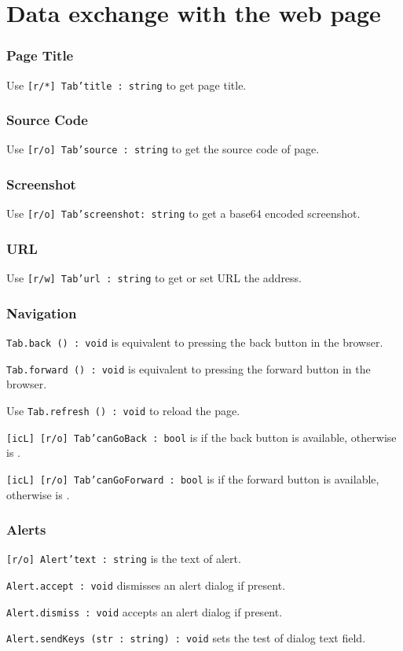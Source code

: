 \section{Data exchange with the web page}
\label{dataexchange}

\subsubsection{Page Title}

Use \texttt{[r/*] Tab'title : string} to get page title.

\subsubsection{Source Code}

Use \texttt{[r/o] Tab'source : string} to get the source code of page.

\subsubsection{Screenshot}

Use \texttt{[r/o] Tab'screenshot: string} to get a base64 encoded screenshot.

\subsubsection{URL}

Use \texttt{[r/w] Tab'url : string} to get or set URL the address.

\subsubsection{Navigation}

\texttt{Tab.back () : void} is equivalent to pressing the back button in the browser.

\texttt{Tab.forward () : void} is equivalent to pressing the forward button in the browser.

Use \texttt{Tab.refresh () : void} to reload the page.

\texttt{[icL] [r/o] Tab'canGoBack : bool} is \true{} if the back button is available, otherwise is \false.

\texttt{[icL] [r/o] Tab'canGoForward : bool} is \true{} if the forward button is available, otherwise is \false.


\subsubsection{Alerts}

\texttt{[r/o] Alert'text : string} is the text of alert.

\texttt{Alert.accept : void} dismisses an alert dialog if present.

\texttt{Alert.dismiss : void} accepts an alert dialog if present.

\texttt{Alert.sendKeys (str : string) : void} sets the test of dialog text field.
